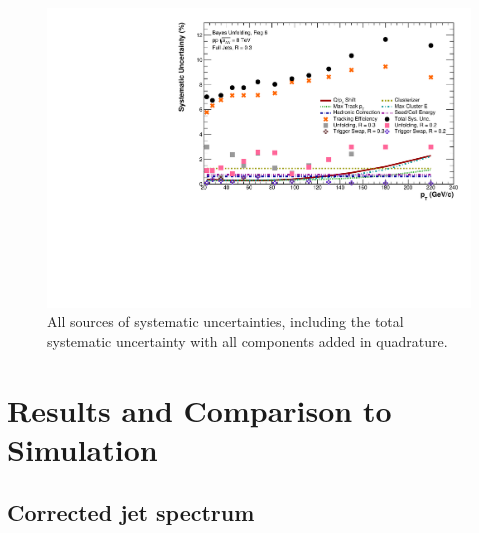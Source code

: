\documentclass[ALICE]{ALICE_analysis_notes}
\begin{document}
\begin{figure}
    \centering
    \includegraphics[width=15cm]{figures/Systematics/ratios/TotalSystematics_R02R03.pdf}
    \caption{All sources of systematic uncertainties, including the total systematic uncertainty with all components added in quadrature.}
    \label{fig:SystematicsRatiosR02}
\end{figure}\clearpage{}
\clearpage{}\section{Results and Comparison to Simulation}
\label{chap:results}

\subsection{Corrected jet spectrum}
\label{sec:corrJetSpectrum}
\end{document}
